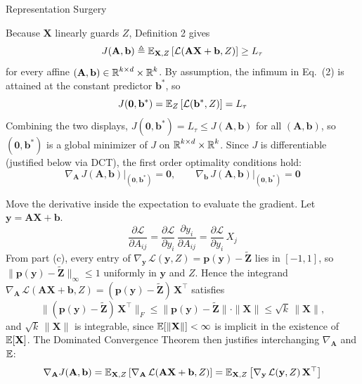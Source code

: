 \begin{question}{Representation Surgery}
\begin{subquestion}
Because $\mathbf{X}$ linearly guards $Z$, Definition 2 gives
\begin{equation}
    J(\mathbf{A}, \mathbf{b}) \triangleq \expectation_{\mathbf{X}, Z}\left[\mathcal{L}(\mathbf{A}\mathbf{X} + \mathbf{b}, Z)\right] \geq L_\tau
\end{equation}
for every affine $(\mathbf{A}, \mathbf{b}) \in \R^{k \times d} \times \R^k$. 
By assumption, the infimum in Eq.~(2) is attained at the constant predictor $\mathbf{b}^\ast$, so
\begin{equation}
    J(\mathbf{0}, \mathbf{b}^\ast) = \expectation_Z\left[\mathcal{L}(\mathbf{b}^\ast, Z)\right] = L_\tau
\end{equation}
Combining the two displays, $J(\mathbf{0}, \mathbf{b}^\ast) = L_\tau \leq J(\mathbf{A}, \mathbf{b})$ for all $(\mathbf{A}, \mathbf{b})$, so $(\mathbf{0}, \mathbf{b}^\ast)$ is a global minimizer of $J$ on $\R^{k \times d} \times \R^k$. 
Since $J$ is differentiable (justified below via DCT), the first order optimality conditions hold:
\begin{equation}
    \nabla_{\mathbf{A}}\, J(\mathbf{A}, \mathbf{b})\Big|_{(\mathbf{0}, \mathbf{b}^\ast)} = \mathbf{0}, \qquad \nabla_{\mathbf{b}}\, J(\mathbf{A}, \mathbf{b})\Big|_{(\mathbf{0}, \mathbf{b}^\ast)} = \mathbf{0}
\end{equation}

Move the derivative inside the expectation to evaluate the gradient. Let $\mathbf{y} = \mathbf{A}\mathbf{X} + \mathbf{b}$.
\begin{equation}
    \frac{\partial \mathcal{L}}{\partial A_{ij}} = \frac{\partial \mathcal{L}}{\partial y_i}\, \frac{\partial y_i}{\partial A_{ij}} = \frac{\partial \mathcal{L}}{\partial y_i}\, X_j
\end{equation}
From part (c), every entry of $\nabla_{\mathbf{y}}\, \mathcal{L}(\mathbf{y}, Z) = \mathbf{p}(\mathbf{y}) - \widetilde{\mathbf{Z}}$ lies in $[-1, 1]$, so $\|\mathbf{p}(\mathbf{y}) - \widetilde{\mathbf{Z}}\|_\infty \leq 1$ uniformly in $\mathbf{y}$ and $Z$. 
Hence the integrand $\nabla_{\mathbf{A}}\, \mathcal{L}(\mathbf{A}\mathbf{X} + \mathbf{b}, Z) = (\mathbf{p}(\mathbf{y}) - \widetilde{\mathbf{Z}})\, \mathbf{X}^\top$ satisfies
\begin{equation}
    \big\| (\mathbf{p}(\mathbf{y}) - \widetilde{\mathbf{Z}})\, \mathbf{X}^\top \big\|_F \leq \|\mathbf{p}(\mathbf{y}) - \widetilde{\mathbf{Z}}\| \cdot \|\mathbf{X}\| \leq \sqrt{k}\, \|\mathbf{X}\|,
\end{equation}
and $\sqrt{k}\,\|\mathbf{X}\|$ is integrable, since $\expectation[\|\mathbf{X}\|] < \infty$ is implicit in the existence of $\expectation[\mathbf{X}]$. 
The Dominated Convergence Theorem then justifies interchanging $\nabla_{\mathbf{A}}$ and $\expectation$:
\begin{equation}
    \nabla_{\mathbf{A}} J(\mathbf{A}, \mathbf{b}) = \expectation_{\mathbf{X}, Z}\left[\nabla_{\mathbf{A}}\, \mathcal{L}(\mathbf{A}\mathbf{X} + \mathbf{b}, Z)\right] = \expectation_{\mathbf{X}, Z}\left[\nabla_{\mathbf{y}}\, \mathcal{L}(\mathbf{y}, Z)\, \mathbf{X}^\top\right]
\end{equation}


\end{subquestion}
\end{question}
